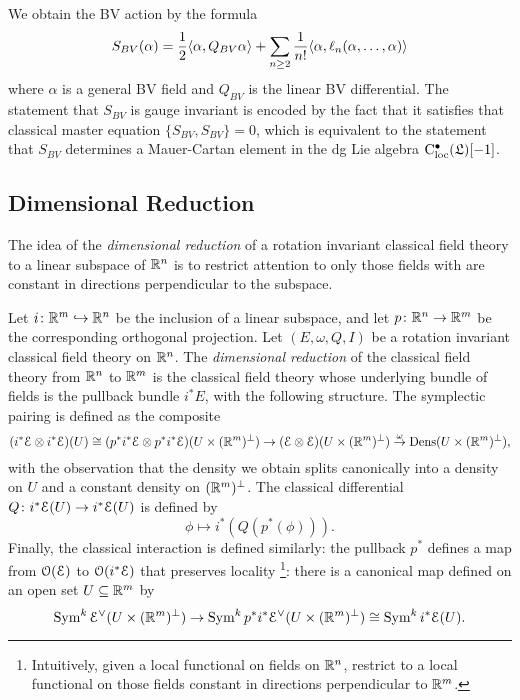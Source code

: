 \documentclass[10pt, oneside]{article}
\begin{document}
We obtain the BV action by the formula
\[
S_{BV} (\alpha) = \frac{1}{2} \langle\alpha , Q_{BV} \alpha\rangle + \sum_{n \geq 2} \frac{1}{n!} \langle\alpha, \ell_n(\alpha,\ldots, \alpha)\rangle 
\]
where $\alpha$ is a general BV field and $Q_{BV}$ is the linear BV differential. 
The statement that $S_{BV}$ is gauge invariant is encoded by the fact that it satisfies that classical master equation $\{S_{BV}, S_{BV}\} = 0$, which is equivalent to the statement that $S_{BV}$ determines a Mauer-Cartan element in the dg Lie algebra ${\rm C}_{\rm loc}^\bullet(\mathfrak L)[-1]$.

\subsection{Dimensional Reduction} \label{dim_red_section}
The idea of the \emph{dimensional reduction} of a rotation invariant classical field theory to a linear subspace of $\mathbb R^n$ is to restrict attention to only those fields with are constant in directions perpendicular to the subspace. 

\begin{definition}
Let $i\colon \mathbb R^m \hookrightarrow \mathbb R^n$ be the inclusion of a linear subspace, and let $p \colon \mathbb R^n \to \mathbb R^m$ be the corresponding orthogonal projection. Let $(E, \omega, Q, I)$ be a rotation invariant classical field theory on $\mathbb R^n$.  The \emph{dimensional reduction} of the classical field theory from $\mathbb R^n$ to $\mathbb R^m$ is the classical field theory whose underlying bundle of fields is the pullback bundle $i^*E$, with the following structure.  The symplectic pairing is defined as the composite
\[(i^*\mathcal{E} \otimes i^*\mathcal{E})(U) \cong (p^*i^*\mathcal{E} \otimes p^*i^*\mathcal{E})(U \times (\mathbb R^m)^\perp) \to (\mathcal{E} \otimes \mathcal{E})(U \times (\mathbb R^m)^\perp) \overset \omega \to \operatorname{Dens}(U \times (\mathbb R^m)^\perp),\]
with the observation that the density we obtain splits canonically into a density on $U$ and a constant density on $(\mathbb R^m)^\perp$.  The classical differential $Q \colon i^*\mathcal{E}(U) \to i^*\mathcal{E}(U)$ is defined by
\[\phi \mapsto i^*(Q(p^*(\phi))).\]
Finally, the classical interaction is defined similarly: the pullback $p^*$ defines a map from $\mathcal{O}(\mathcal{E})$ to $\mathcal{O}(i^*\mathcal{E})$ that preserves locality \footnote{Intuitively, given a local functional on fields on $\mathbb R^n$, restrict to a local functional on those fields constant in directions perpendicular to $\mathbb R^m$.}: there is a canonical map defined on an open set $U \subseteq \mathbb R^m$ by
\[\operatorname{Sym}^k \mathcal{E}^\vee(U\times (\mathbb R^m)^\perp) \to \operatorname{Sym}^k p^*i^*\mathcal{E}^\vee(U\times (\mathbb R^m)^\perp) \cong \operatorname{Sym}^k i^*\mathcal{E}(U).\]
\end{definition}
\end{document}
